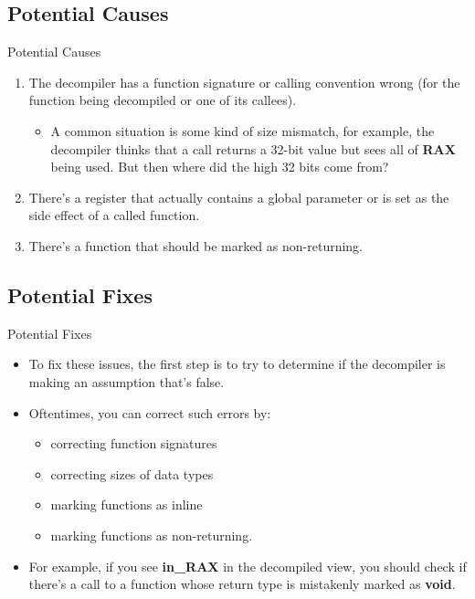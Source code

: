 \documentclass{beamer}
\begin{document}
\subsection{Potential Causes}
\begin{frame}
\begin{block}{Potential Causes}
\begin{enumerate}
\item The decompiler has a function signature or calling convention wrong (for the function being decompiled or one of its callees). 
\begin{itemize}
\item A common situation is some kind of size mismatch, for example, the decompiler thinks that a call returns a 32-bit value but sees all of 
\textbf{RAX} being used. But then where did the high 32 bits come from?
\end{itemize}
\item There's a register that actually contains a global parameter or is set as the side effect of a called function.
\item There's a function that should be marked as non-returning.
\end{enumerate}
\end{block}
\end{frame}

\subsection{Potential Fixes}
\begin{frame}
\begin{block}{Potential Fixes}
\begin{itemize}
\item To fix these issues, the first step is to try to determine if the decompiler is making an assumption that's false.
\item Oftentimes, you can correct such errors by:
\begin{itemize}
\item correcting function signatures
\item correcting sizes of data types
\item marking functions as inline
\item marking functions as non-returning.
\end{itemize}
\item For example, if you see \textbf{in\_RAX} in the decompiled view, you should check if there's a call to a function whose return type is mistakenly marked as \textbf{void}.
\end{itemize}
\end{block}
\end{frame}
\end{document}
